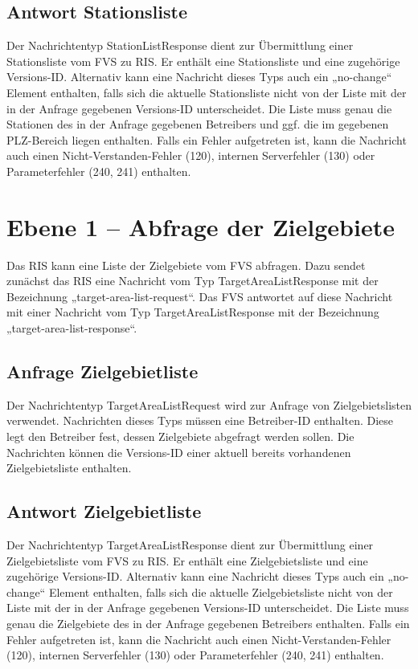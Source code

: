 

\subsection{Antwort Stationsliste}
Der Nachrichtentyp StationListResponse dient zur Übermittlung einer Stationsliste vom FVS zu RIS. Er enthält eine Stationsliste und eine zugehörige Versions-ID. Alternativ kann eine Nachricht dieses Typs auch ein „no-change“ Element enthalten, falls sich die aktuelle Stationsliste nicht von der Liste mit der in der Anfrage gegebenen Versions-ID  unterscheidet. Die Liste muss genau die Stationen des in der Anfrage gegebenen Betreibers und ggf. die im gegebenen PLZ-Bereich liegen enthalten. Falls ein Fehler aufgetreten ist, kann die Nachricht auch einen Nicht-Verstanden-Fehler (120), internen Serverfehler (130) oder Parameterfehler (240, 241) enthalten.




\section{Ebene 1 -- Abfrage der Zielgebiete}
Das RIS kann eine Liste der Zielgebiete vom FVS abfragen. Dazu sendet zunächst das RIS eine Nachricht vom Typ TargetAreaListResponse mit der Bezeichnung „target-area-list-request“. Das FVS antwortet auf diese Nachricht mit einer Nachricht vom Typ TargetAreaListResponse mit der Bezeichnung „target-area-list-response“.



\subsection{Anfrage Zielgebietliste}
Der Nachrichtentyp TargetAreaListRequest wird zur Anfrage von Zielgebietslisten verwendet. Nachrichten dieses Typs müssen eine Betreiber-ID enthalten. Diese legt den Betreiber fest, dessen Zielgebiete abgefragt werden sollen. Die Nachrichten können die Versions-ID einer aktuell bereits vorhandenen Zielgebietsliste enthalten.



\subsection{Antwort Zielgebietliste}
Der Nachrichtentyp TargetAreaListResponse dient zur Übermittlung einer Zielgebietsliste vom FVS zu RIS. Er enthält eine Zielgebietsliste und eine zugehörige Versions-ID. Alternativ kann eine Nachricht dieses Typs auch ein „no-change“ Element enthalten, falls sich die aktuelle Zielgebietsliste nicht von der Liste mit der in der Anfrage gegebenen Versions-ID  unterscheidet. Die Liste muss genau die Zielgebiete des in der Anfrage gegebenen Betreibers enthalten. Falls ein Fehler aufgetreten ist, kann die Nachricht auch einen Nicht-Verstanden-Fehler (120), internen Serverfehler (130) oder Parameterfehler (240, 241) enthalten.

